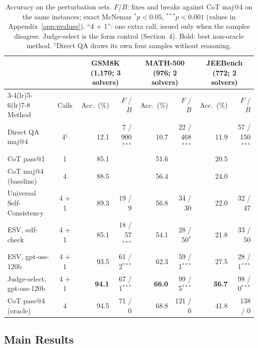 \documentclass[letterpaper]{article} %
\begin{document}
\begin{table}[t]
\centering
\small
\setlength{\tabcolsep}{4.2pt}
\begin{tabular}{lc rr rr rr}
\toprule
 & & \multicolumn{2}{c}{GSM8K (1{,}170; 3 solvers)} & \multicolumn{2}{c}{MATH-500 (976; 2 solvers)} & \multicolumn{2}{c}{JEEBench (772; 2 solvers)} \\
\cmidrule(lr){3-4}\cmidrule(lr){5-6}\cmidrule(lr){7-8}
Method & Calls & Acc.\ (\%) & $F$ / $B$ & Acc.\ (\%) & $F$ / $B$ & Acc.\ (\%) & $F$ / $B$ \\
\midrule
Direct QA maj@4 & 4$^\dagger$ & 12.1 & 7 / 900$^{***}$ & 10.7 & 22 / 468$^{***}$ & 11.9 & 57 / 150$^{***}$ \\
CoT pass@1 & 1 & 85.1 & & 51.6 & & 20.5 & \\
CoT maj@4 (baseline) & 4 & 88.5 & & 56.4 & & 24.0 & \\
Universal Self-Consistency & 4 + 1 & 89.3 & 19 / 9 & 56.8 & 34 / 30 & 22.0 & 32 / 47 \\
\midrule
ESV, self-check & 4 + 1 & 85.1 & 18 / 57$^{***}$ & 54.1 & 28 / 50$^{*}$ & 21.8 & 33 / 50 \\
ESV, gpt-oss-120b & 4 + 1 & 93.5 & 61 / 2$^{***}$ & 62.3 & 59 / 1$^{***}$ & 27.5 & 28 / 1$^{***}$ \\
Judge-select, gpt-oss-120b & 4 + 1 & \textbf{94.1} & 67 / 1$^{***}$ & \textbf{66.0} & 99 / 5$^{***}$ & \textbf{36.7} & 98 / 0$^{***}$ \\
\midrule
CoT pass@4 (oracle) & 4 & 94.5 & 71 / 0 & 68.8 & 121 / 0 & 41.8 & 138 / 0 \\
\bottomrule
\end{tabular}
\caption{Accuracy on the perturbation sets. $F$/$B$: fixes and breaks against CoT maj@4 on the same instances; exact McNemar $^{*}p<0.05$, $^{***}p<0.001$ (values in Appendix~\ref{app:pvalues}). ``4 + 1'': one extra call, issued only when the samples disagree. Judge-select is the form control (Section~4). Bold: best non-oracle method. $^\dagger$Direct QA draws its own four samples without reasoning.}
\label{tab:main}
\end{table}

\subsection{Main Results}
\label{sec:main}
\end{document}

